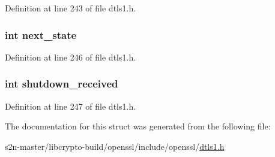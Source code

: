 Definition at line 243 of file dtls1.\+h.

\subsubsection[{\texorpdfstring{next\+\_\+state}{next_state}}]{\setlength{\rightskip}{0pt plus 5cm}int next\+\_\+state}\hypertarget{structdtls1__state__st_ac0c302bc97f010b7f5965faa07b00354}{}\label{structdtls1__state__st_ac0c302bc97f010b7f5965faa07b00354}


Definition at line 246 of file dtls1.\+h.

\subsubsection[{\texorpdfstring{shutdown\+\_\+received}{shutdown_received}}]{\setlength{\rightskip}{0pt plus 5cm}int shutdown\+\_\+received}\hypertarget{structdtls1__state__st_a27ee0ed9ce27010981b9513e1ee71458}{}\label{structdtls1__state__st_a27ee0ed9ce27010981b9513e1ee71458}


Definition at line 247 of file dtls1.\+h.



The documentation for this struct was generated from the following file\+:\begin{DoxyCompactItemize}
\item 
s2n-\/master/libcrypto-\/build/openssl/include/openssl/\hyperlink{include_2openssl_2dtls1_8h}{dtls1.\+h}\end{DoxyCompactItemize}
